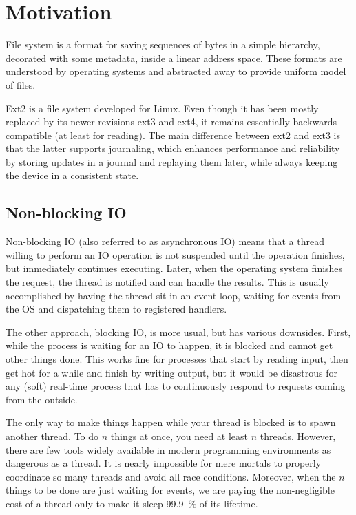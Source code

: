 \chapter{Motivation}

File system is a format for saving sequences of bytes in a simple hierarchy,
decorated with some metadata, inside a linear address space. These formats are
understood by operating systems and abstracted away to provide uniform model of
files.

Ext2 is a file system developed for Linux. Even though it has been mostly
replaced by its newer revisions ext3 and ext4, it remains essentially backwards
compatible (at least for reading). The main difference between ext2 and ext3 is
that the latter supports journaling, which enhances performance and reliability
by storing updates in a journal and replaying them later, while always keeping
the device in a consistent state.

\section{Non-blocking IO}

Non-blocking IO (also referred to as asynchronous IO) means that a thread
willing to perform an IO operation is not suspended until the operation
finishes, but immediately continues executing. Later, when the operating system
finishes the request, the thread is notified and can handle the results. This is
usually accomplished by having the thread sit in an event-loop, waiting for
events from the OS and dispatching them to registered handlers.

The other approach, blocking IO, is more usual, but has various downsides.
First, while the process is waiting for an IO to happen, it is blocked and
cannot get other things done. This works fine for processes that start by
reading input, then get hot for a while and finish by writing output, but it
would be disastrous for any (soft) real-time process that has to continuously
respond to requests coming from the outside.

The only way to make things happen while your thread is blocked is to spawn
another thread. To do $n$ things at once, you need at least $n$ threads.
However, there are few tools widely available in modern programming environments
as dangerous as a thread. It is nearly impossible for mere mortals to properly
coordinate so many threads and avoid all race conditions. Moreover, when the $n$
things to be done are just waiting for events, we are paying the non-negligible
cost of a thread only to make it sleep 99.9~\% of its lifetime.

